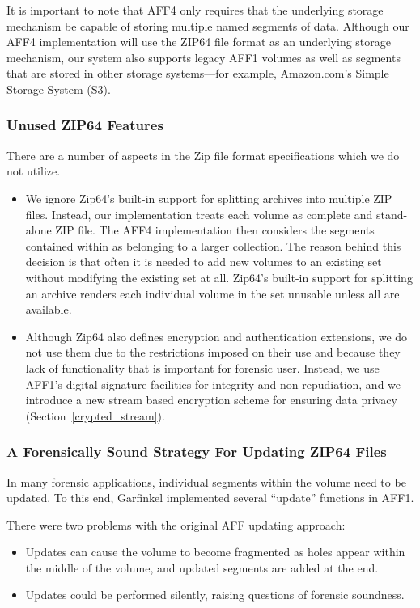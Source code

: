 \documentclass[10pt, conference]{IEEEtran}
\begin{document}
It is important to note that AFF4 only requires that the underlying storage mechanism
be capable of storing multiple named segments of data. Although our
AFF4 implementation will use the ZIP64 file format as an underlying storage
mechanism, our system also supports legacy AFF1 volumes as well as
segments that are stored in other storage systems---for example,
Amazon.com's Simple Storage System (S3)\cite{s2-aws-home-page-money}.

\subsubsection{Unused ZIP64 Features}

There are a number of aspects in the Zip file format specifications
which we do not utilize. 
\begin{itemize}
\item We ignore Zip64's built-in support for splitting
archives into multiple ZIP files. Instead, our implementation treats
each volume as complete and stand-alone ZIP file. The AFF4
implementation then considers the segments contained within as 
belonging to a larger collection. The reason behind this decision is that
often it is needed to add new volumes to an existing set without
modifying the existing set at all. Zip64's built-in support for
splitting an archive renders each individual volume in the set
unusable unless all are available. 

\item Although Zip64 also defines encryption and authentication
extensions, we do not use them due to the
restrictions imposed on their use and because they lack of functionality that is
important for forensic user. Instead, we use AFF1's digital signature
facilities for integrity and non-repudiation, and we introduce a new  stream based
encryption scheme for ensuring data privacy (Section~\ref{crypted_stream}).

\end{itemize}

\subsubsection{A Forensically Sound Strategy For Updating ZIP64 Files}

In many forensic applications, individual segments within the volume
need to be updated. To this end, Garfinkel implemented several
``update'' functions in AFF1\cite{garfinkel:aff}. 

There were two problems with the original AFF updating approach:
\begin{itemize}
\item Updates can cause the volume to
become fragmented as holes appear within the middle of the volume, and
updated segments are added at the end.
\item Updates could be performed silently, raising questions of
  forensic soundness.
\end{itemize}
\end{document}
